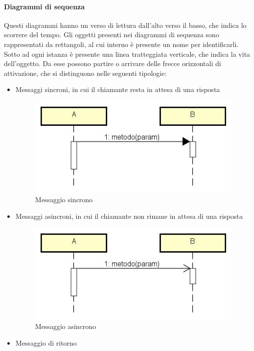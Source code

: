 \paragraph{Diagrammi di sequenza}\Spazio
Questi diagrammi hanno un verso di lettura dall'alto verso il basso, che indica lo scorrere del tempo. 
Gli oggetti presenti nei diagrammi di sequenza sono rappresentati da rettangoli, al cui interno è presente un nome per identificarli. Sotto ad ogni istanza è presente una linea tratteggiata verticale, che indica la vita dell'oggetto. Da esse possono partire o arrivare delle frecce orizzontali di attivazione, che si distinguono nelle seguenti tipologie:
\begin{itemize}
	\item Messaggi sincroni, in cui il chiamante resta in attesa di una risposta
	\begin{figure} [H]
		\centering
		\includegraphics[scale=0.7]{./Img/sequence_sincrono.jpg}
		\caption{Messaggio sincrono}\label{}
	\end{figure}
	\item Messaggi asincroni, in cui il chiamante non rimane in attesa di una risposta
	\begin{figure} [H]
		\centering
		\includegraphics[scale=0.7]{./Img/sequence_asincrono.jpg}
		\caption{Messaggio asincrono}\label{}
	\end{figure}
	\item Messaggio di ritorno
	\begin{figure} [H]

\end{figure}
\end{itemize}
